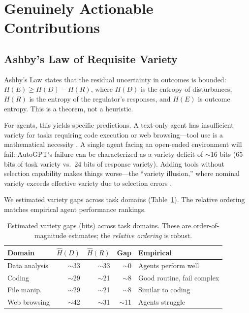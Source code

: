\documentclass[11pt]{article}
\begin{document}
\section{Genuinely Actionable Contributions}

\subsection{Ashby's Law of Requisite Variety}

Ashby's Law \cite{ashby1956introduction} states that the residual uncertainty in outcomes is bounded: $H(E) \geq H(D) - H(R)$, where $H(D)$ is the entropy of disturbances, $H(R)$ is the entropy of the regulator's responses, and $H(E)$ is outcome entropy. This is a theorem, not a heuristic.

For agents, this yields specific predictions. A text-only agent has insufficient variety for tasks requiring code execution or web browsing---tool use is a mathematical necessity \cite{schick2023toolformer}. A single agent facing an open-ended environment will fail: AutoGPT's failure can be characterized as a variety deficit of ${\sim}$16 bits (65 bits of task variety vs.\ 24 bits of response variety). Adding tools without selection capability makes things worse---the ``variety illusion,'' where nominal variety exceeds effective variety due to selection errors \cite{patil2023gorilla}.

We estimated variety gaps across task domains (Table~\ref{tab:variety}). The relative ordering matches empirical agent performance rankings.

\begin{table}[t]
\centering
\small
\begin{tabular}{lrrrl}
\toprule
\textbf{Domain} & $\hat{H}(D)$ & $\hat{H}(R)$ & \textbf{Gap} & \textbf{Empirical} \\
\midrule
Data analysis & ${\sim}$33 & ${\sim}$33 & ${\sim}$0 & Agents perform well \\
Coding & ${\sim}$29 & ${\sim}$21 & ${\sim}$8 & Good routine, fail complex \\
File manip. & ${\sim}$29 & ${\sim}$21 & ${\sim}$8 & Similar to coding \\
Web browsing & ${\sim}$42 & ${\sim}$31 & ${\sim}$11 & Agents struggle \\
\bottomrule
\end{tabular}
\caption{Estimated variety gaps (bits) across task domains. These are order-of-magnitude estimates; the \emph{relative ordering} is robust.}
\label{tab:variety}
\end{table}
\end{document}
